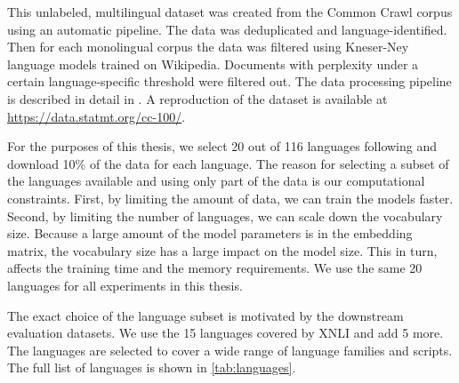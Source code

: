 This unlabeled, multilingual dataset was created from the Common Crawl corpus using an automatic pipeline. The data was deduplicated and language-identified. Then for each monolingual corpus the data was filtered using Kneser-Ney language models trained on Wikipedia. Documents with perplexity under a certain language-specific threshold were filtered out. The data processing pipeline is described in detail in \citet{wenzek_ccnet_nodate}. A reproduction of the dataset is available at \url{https://data.statmt.org/cc-100/}.

For the purposes of this thesis, we select 20 out of 116 languages following \citet{limisiewicz_tokenization_2023} and download 10\% of the data for each language. The reason for selecting a subset of the languages available and using only part of the data is our computational constraints. First, by limiting the amount of data, we can train the models faster. Second, by limiting the number of languages, we can scale down the vocabulary size. Because a large amount of the model parameters is in the embedding matrix, the vocabulary size has a large impact on the model size. This in turn, affects the training time and the memory requirements. We use the same 20 languages for all experiments in this thesis.

The exact choice of the language subset is motivated by the downstream evaluation datasets. We use the 15 languages covered by XNLI and add 5 more. The languages are selected to cover a wide range of language families and scripts. The full list of languages is shown in \autoref{tab:languages}.






